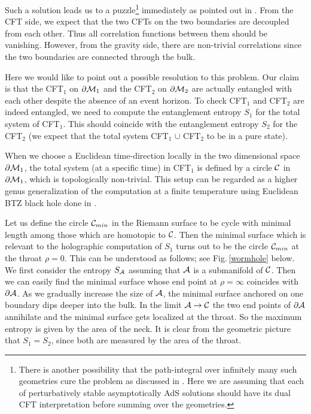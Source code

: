 \documentclass[12pt]{article}
\def\fig#1{Fig.\,\ref{#1}}
\def\p{\partial}
\def\CA{{\cal A}}
\def\p{\partial}
\def\p{\partial}
\def\bdy{\p{\cal M}}
\def\rA{\CA}
\def\brA{\p \CA}
\begin{document}
Such a solution leads us to a puzzle\footnote{There is another
possibility that the path-integral over infinitely many such
geometries cure the problem as discussed in \cite{Maldacena:2004rf}.
Here we are assuming that each of perturbatively stable
asymptotically AdS solutions should have its dual CFT interpretation
before summing over the geometries.} immediately as pointed out in
\cite{Maldacena:2004rf}. From the CFT side, we expect that the two
CFTs on the two boundaries are decoupled from each other. Thus all
correlation functions between them should be vanishing. However,
from the gravity side, there are non-trivial correlations since the
two boundaries are connected through the bulk.

Here we would like to point out a possible resolution to this
problem. Our claim is that the CFT$_1$ on $\bdy_1$ and the
CFT$_2$ on $\bdy_2$ are actually entangled with each other despite
the absence of an event horizon. To check CFT$_1$ and CFT$_2$ are
indeed entangled, we need to compute the entanglement entropy $S_1$
for the total system of CFT$_1$. This should coincide with the entanglement entropy
$S_2$ for the CFT$_2$ (we expect that the total  system CFT$_1$  $\cup$
CFT$_2$ to be in a pure state).

When we choose a Euclidean time-direction locally in the two dimensional space
$\bdy_1$, the total system  (at a specific time)  in CFT$_1$ is defined by a
circle ${\cal C}$ in $\bdy_1$, which is topologically non-trivial.
This setup can be regarded as a higher genus generalization of the
computation at a finite temperature using Euclidean BTZ black hole
done in \cite{Ryu:2006ef, Ryu:2006bv}.

Let us define the circle ${\cal C}_{min}$ in the Riemann surface to
be cycle with minimal length among those which are homotopic to
${\cal C}$. Then the minimal surface which is relevant  to the
holographic computation of $S_1$ turns out to be the circle ${\cal
C}_{min}$ at the throat $\rho=0$. This can be understood as follows;
see \fig{wormhole} below. We first consider the entropy $S_{\rA}$
assuming that $\rA$ is a submanifold of ${\cal C}$. Then we can
easily find the minimal surface whose end point at $\rho=\infty$
coincides with $\brA$. As we gradually increase the size of $\rA$,
the minimal surface anchored  on one boundary dips deeper into the
bulk. In the limit $\rA \to {\cal C}$ the two end points of $\brA$
 annihilate and the minimal surface gets localized at the throat. So the maximum entropy
  is given by the area of the neck. It is clear from the geometric picture that
$S_1=S_2$, since both are measured by the area of the throat.
\end{document}
